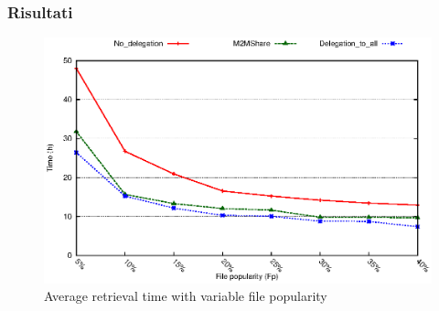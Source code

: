 \documentclass{beamer}
\begin{document}
\begin{frame}
\label{diversa pop}
\frametitle{Risultati}
\begin{center}
\begin{figure}[ht]
\includegraphics[scale=0.7]{tempiVFDiversaPop_zoom.eps}
    \caption{Average retrieval time with variable file popularity}
\end{figure}
\end{center}
\end{frame}
%
%
%
\end{document}
